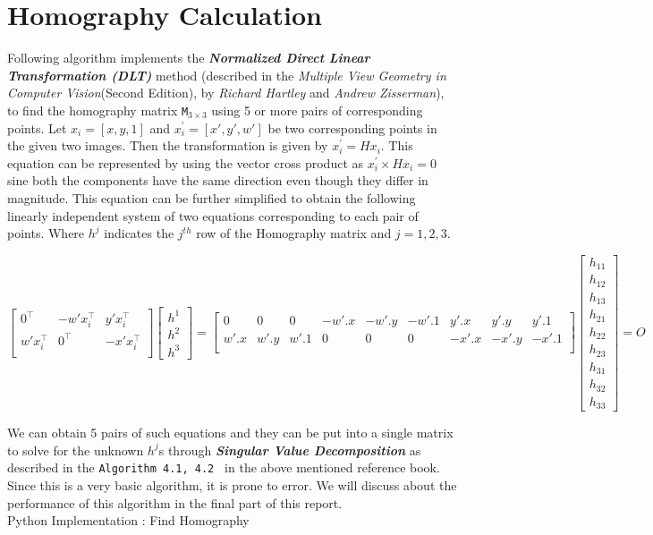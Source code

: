 \section{Homography Calculation}


Following algorithm implements the \textbf{\textit{Normalized Direct Linear Transformation (DLT)}} method (described in the \textit{Multiple View Geometry in Computer Vision}(Second Edition), by \textit{Richard Hartley} and   \textit{Andrew Zisserman}), to find the homography matrix {\tt M}$_{3 \times 3}$ using 5 or more pairs of corresponding points. Let $x_i = [x , y, 1]$ and $x_i^\prime = [x\prime , y\prime, w\prime ] $  be two corresponding points in the given two images. Then the transformation is given by $x_i^\prime = Hx_i$. This equation can be represented by using the vector cross product as  $x_i^\prime \times Hx_i = 0$ sine both the components have the same direction even though they differ in magnitude. This equation can be further simplified  to obtain the following linearly independent  system of two equations corresponding to each pair of points. Where $h^j$ indicates the $j^{th}$ row of the Homography matrix and $j = {1,2,3}$.

{\footnotesize
\begin{equation*}
	\begin{bmatrix}
		0^\top & -w\prime x_i^\top & y\prime x_i^\top\\
		w\prime x_i^\top	& 0^\top & -x\prime x_i^\top\\
	\end{bmatrix} 
	\begin{bmatrix}
		h^1\\
		h^2\\
		h^3
	\end{bmatrix} =
	\begin{bmatrix}
		0& 0 &0 & -w\prime.x&-w\prime.y&-w\prime.1& y\prime.x & y\prime.y& y\prime.1\\
		w\prime.x&w\prime.y&w\prime.1& 0& 0 &0 & -x\prime.x& -x\prime.y& -x\prime.1\\
	\end{bmatrix}
	\begin{bmatrix}
		h_{11}\\
		h_{12}\\
		h_{13}\\
		h_{21}\\
        h_{22}\\
        h_{23}\\
		h_{31}\\
        h_{32}\\
        h_{33}
	\end{bmatrix} = O
\end{equation*}
}

We can obtain 5 pairs of such equations and they can be put into a single matrix to solve for the unknown  $h^j$s through \textbf{\textit{Singular Value Decomposition}} as described in the {\tt Algorithm 4.1, 4.2 } in the above mentioned reference book. Since this is a very basic algorithm, it is prone to error. We will discuss about the performance of this algorithm in the final part of this report.\\
{\color{cyan} Python Implementation : Find Homography}
